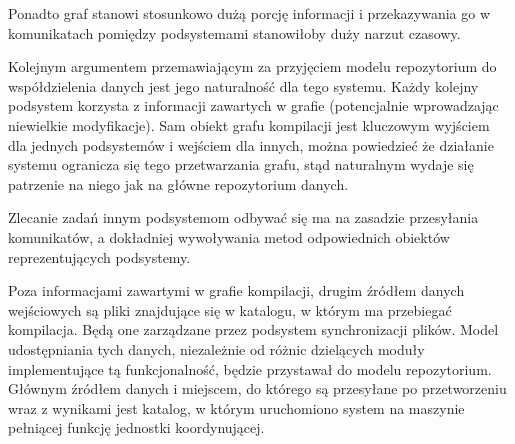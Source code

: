 \documentclass[a4paper]{article}
\begin{document}
Ponadto graf stanowi stosunkowo dużą porcję informacji i przekazywania go w komunikatach pomiędzy podsystemami stanowiłoby duży narzut czasowy.

Kolejnym argumentem przemawiającym za przyjęciem modelu repozytorium do współdzielenia danych jest jego naturalność dla tego systemu.
Każdy kolejny podsystem korzysta z informacji zawartych w grafie (potencjalnie wprowadzając niewielkie modyfikacje).
Sam obiekt grafu kompilacji jest kluczowym wyjściem dla jednych podsystemów i wejściem dla innych, można powiedzieć że działanie systemu ogranicza się tego przetwarzania grafu, stąd naturalnym wydaje się patrzenie na niego jak na główne repozytorium danych.

Zlecanie zadań innym podsystemom odbywać się ma na zasadzie przesyłania komunikatów, a dokładniej wywoływania metod odpowiednich obiektów reprezentujących podsystemy.

Poza informacjami zawartymi w grafie kompilacji, drugim źródłem danych wejściowych są pliki znajdujące się w katalogu, w którym ma przebiegać kompilacja.
Będą one zarządzane przez podsystem synchronizacji plików.
Model udostępniania tych danych, niezależnie od różnic dzielących moduły implementujące tą funkcjonalność, będzie przystawał do modelu repozytorium.
Głównym źródłem danych i miejscem, do którego są przesyłane po przetworzeniu wraz z wynikami jest katalog, w którym uruchomiono system na maszynie pełniącej funkcję jednostki koordynującej.
\end{document}
